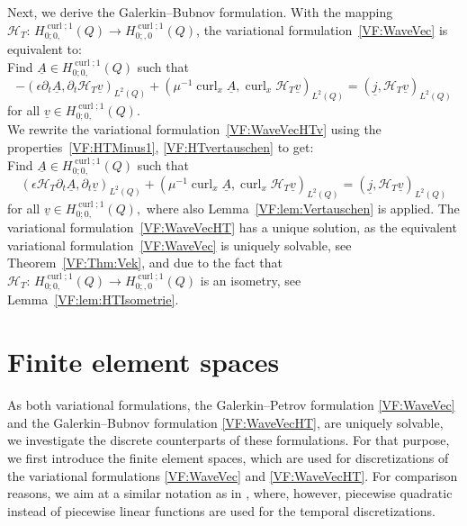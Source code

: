 \documentclass[a4paper,11pt]{article}
\newcommand{\cu}{\operatorname{curl}}
\renewcommand{\vec}[1]{\underline{#1}}
\begin{document}
Next, we derive the Galerkin--Bubnov formulation. With the mapping ${\mathcal{H}}_T \colon \, H^{\cu;1}_{0;0,} (Q) \to H^{\cu;1}_{0;,0} (Q)$, the variational formulation~\eqref{VF:WaveVec} is equivalent to:\\
Find $\vec A \in H^{\cu;1}_{0;0,} (Q)$ such that
\begin{equation}\label{VF:WaveVecHTv}
	-(\epsilon\partial_t \vec A,\partial_t \mathcal H_T \vec v)_{L^2(Q)}+ (\mu^{-1} \cu_x \vec A,\cu_x \mathcal H_T \vec v)_{L^2(Q)} = (\vec j, \mathcal H_T \vec v)_{L^2(Q)}
\end{equation}
for all $\vec v \in H^{\cu;1}_{0;0,} (Q).$\\
We rewrite the variational formulation~\eqref{VF:WaveVecHTv} using the properties~\eqref{VF:HTMinus1}, \eqref{VF:HTvertauschen} to get:\\
Find $\vec A \in H^{\cu;1}_{0;0,} (Q)$ such that
\begin{equation}
	\label{VF:WaveVecHT}
	(\epsilon \mathcal H_T \partial_t \vec A,\partial_t \vec v)_{L^2(Q)}+ (\mu^{-1} \cu_x \vec A,\cu_x \mathcal H_T \vec v)_{L^2(Q)} = (\vec j, \mathcal H_T \vec v)_{L^2(Q)}
\end{equation}
for all $ \vec v \in H^{\cu;1}_{0;0,} (Q),$ where also Lemma~\ref{VF:lem:Vertauschen} is applied. The variational formulation~\eqref{VF:WaveVecHT} has a unique solution, as the equivalent variational formulation~\eqref{VF:WaveVec} is uniquely solvable, see Theorem~\ref{VF:Thm:Vek}, and due to the fact that ${\mathcal{H}}_T \colon \, H^{\cu;1}_{0;0,} (Q) \to H^{\cu;1}_{0;,0} (Q)$ is an isometry, see Lemma~\ref{VF:lem:HTIsometrie}.


\section{Finite element spaces} \label{Sec:FES}

As both variational formulations, the Galerkin--Petrov formulation \eqref{VF:WaveVec} and the Galerkin--Bubnov formulation \eqref{VF:WaveVecHT}, are uniquely solvable, we investigate the discrete counterparts of these formulations. For that purpose, we first introduce the finite element spaces, which are used for discretizations of the variational formulations \eqref{VF:WaveVec} and \eqref{VF:WaveVecHT}. For comparison reasons, we aim at a similar notation as in \cite[Subsection~3.1]{HauserOhm2023}, where, however, piecewise quadratic instead of piecewise linear functions are used for the temporal discretizations.
\end{document}

